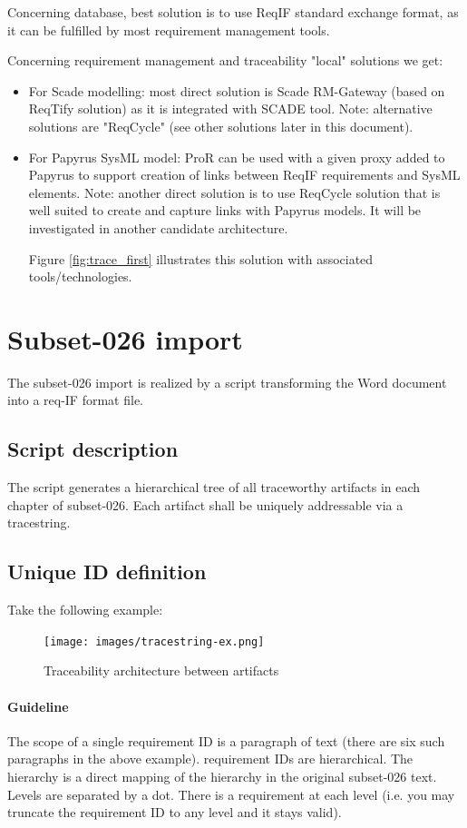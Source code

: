 \documentclass[11pt]{template/openetcs_report}
\begin{document}
Concerning database, best solution is to use ReqIF standard exchange format, as it can be fulfilled by most requirement management tools. 

Concerning requirement management and traceability "local" solutions we get: 
\begin{itemize}
\item For Scade modelling: most direct solution is Scade RM-Gateway (based on ReqTify solution) as it is integrated with SCADE tool.
Note: alternative solutions are "ReqCycle" (see other solutions later in this document).
\item For Papyrus SysML model: ProR can be used with a given proxy added to Papyrus to support creation of links between ReqIF requirements and SysML elements.
Note: another direct solution is to use ReqCycle solution that is well suited to create and capture links with Papyrus models. It will be investigated in another candidate architecture.

Figure \ref{fig:trace_first} illustrates this solution with associated tools/technologies.

\end{itemize}



\section{Subset-026 import}
\label{sec-5-1}
The subset-026 import is realized by a script transforming the Word document
into a req-IF format file.
\subsection{Script description}
\label{sec-5-1-1}
The script  generates a hierarchical tree of all traceworthy
artifacts in each chapter of subset-026. Each artifact shall be uniquely
addressable via a tracestring.


\subsection{Unique ID definition}
\label{sec-5-1-2}
Take the following example:
\begin{figure}[htb]
\centering
\texttt{[image: images/tracestring-ex.png]}
\caption{\label{fig:reqID_ex}Traceability architecture between artifacts}
\end{figure}


\paragraph{Guideline}
The scope of a single requirement ID is a paragraph of text (there are six such
paragraphs in the above example).  requirement IDs are hierarchical. The
hierarchy is a direct mapping of the hierarchy in the original subset-026
text. Levels are separated by a dot. There is a requirement at each level
(i.e. you may truncate the requirement ID to any level and it stays valid).
\end{document}
